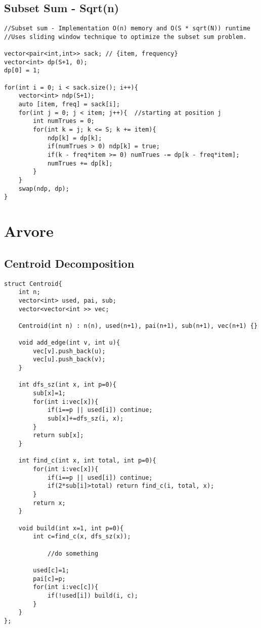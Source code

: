 \documentclass[11pt, a4paper, twoside]{article}
\begin{document}
\subsection{Subset Sum - Sqrt(n)}
\begin{verbatim}
//Subset sum - Implementation O(n) memory and O(S * sqrt(N)) runtime
//Uses sliding window technique to optimize the subset sum problem.

vector<pair<int,int>> sack; // {item, frequency}
vector<int> dp(S+1, 0);
dp[0] = 1;

for(int i = 0; i < sack.size(); i++){
    vector<int> ndp(S+1);
    auto [item, freq] = sack[i];
    for(int j = 0; j < item; j++){  //starting at position j
        int numTrues = 0;
        for(int k = j; k <= S; k += item){
            ndp[k] = dp[k];
            if(numTrues > 0) ndp[k] = true;
            if(k - freq*item >= 0) numTrues -= dp[k - freq*item];
            numTrues += dp[k];
        }
    }
    swap(ndp, dp);
}
\end{verbatim}



%
%

\section{Arvore}

\subsection{Centroid Decomposition}
\begin{verbatim}
struct Centroid{
    int n;
    vector<int> used, pai, sub;
    vector<vector<int >> vec;
    
    Centroid(int n) : n(n), used(n+1), pai(n+1), sub(n+1), vec(n+1) {}
    
    void add_edge(int v, int u){
        vec[v].push_back(u);
        vec[u].push_back(v);
    }
    
    int dfs_sz(int x, int p=0){
        sub[x]=1;
        for(int i:vec[x]){
            if(i==p || used[i]) continue;
            sub[x]+=dfs_sz(i, x);
        }
        return sub[x];
    }
    
    int find_c(int x, int total, int p=0){
        for(int i:vec[x]){
            if(i==p || used[i]) continue;
            if(2*sub[i]>total) return find_c(i, total, x);
        }
        return x;
    }
        
    void build(int x=1, int p=0){
        int c=find_c(x, dfs_sz(x));
    
            //do something
            
        used[c]=1;
        pai[c]=p;
        for(int i:vec[c]){
            if(!used[i]) build(i, c);
        }
    }
};
\end{verbatim}
\end{document}
